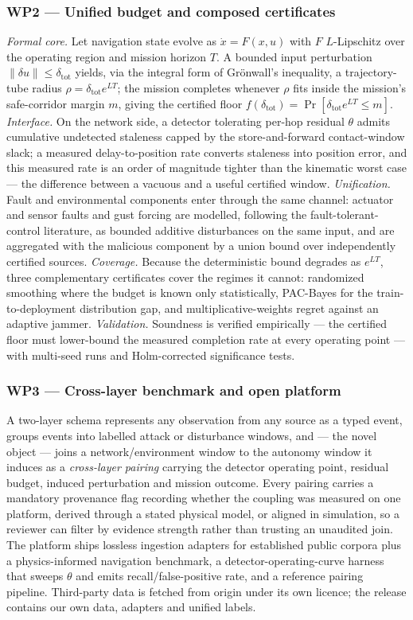 \documentclass[11pt,a4paper]{article}
\begin{document}
\subsubsection{WP2 --- Unified budget and composed certificates}
\emph{Formal core.} Let navigation state evolve as $\dot x = F(x,u)$ with $F$ $L$-Lipschitz over the operating region and mission horizon $T$. A bounded input perturbation $\lVert\delta u\rVert \le \delta_{\text{tot}}$ yields, via the integral form of Gr\"onwall's inequality, a trajectory-tube radius $\rho = \delta_{\text{tot}}e^{LT}$; the mission completes whenever $\rho$ fits inside the mission's safe-corridor margin $m$, giving the certified floor $f(\delta_{\text{tot}}) = \Pr[\delta_{\text{tot}}e^{LT}\le m]$. \emph{Interface.} On the network side, a detector tolerating per-hop residual $\theta$ admits cumulative undetected staleness capped by the store-and-forward contact-window slack; a measured delay-to-position rate converts staleness into position error, and this measured rate is an order of magnitude tighter than the kinematic worst case --- the difference between a vacuous and a useful certified window. \emph{Unification.} Fault and environmental components enter through the same channel: actuator and sensor faults and gust forcing are modelled, following the fault-tolerant-control literature, as bounded additive disturbances on the same input, and are aggregated with the malicious component by a union bound over independently certified sources. \emph{Coverage.} Because the deterministic bound degrades as $e^{LT}$, three complementary certificates cover the regimes it cannot: randomized smoothing where the budget is known only statistically, PAC-Bayes for the train-to-deployment distribution gap, and multiplicative-weights regret against an adaptive jammer. \emph{Validation.} Soundness is verified empirically --- the certified floor must lower-bound the measured completion rate at every operating point --- with multi-seed runs and Holm-corrected significance tests.

\subsubsection{WP3 --- Cross-layer benchmark and open platform}
A two-layer schema represents any observation from any source as a typed event, groups events into labelled attack or disturbance windows, and --- the novel object --- joins a network/environment window to the autonomy window it induces as a \emph{cross-layer pairing} carrying the detector operating point, residual budget, induced perturbation and mission outcome. Every pairing carries a mandatory provenance flag recording whether the coupling was measured on one platform, derived through a stated physical model, or aligned in simulation, so a reviewer can filter by evidence strength rather than trusting an unaudited join. The platform ships lossless ingestion adapters for established public corpora plus a physics-informed navigation benchmark, a detector-operating-curve harness that sweeps $\theta$ and emits recall/false-positive rate, and a reference pairing pipeline. Third-party data is fetched from origin under its own licence; the release contains our own data, adapters and unified labels.
\end{document}

